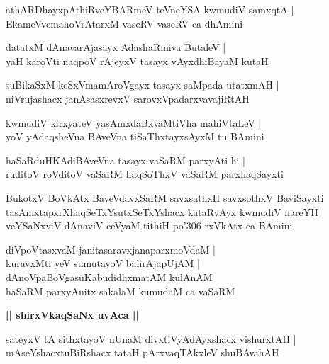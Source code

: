 \documentclass[twoside,12pt,openright]{book}
\newcounter{shloka}[chapter]
\def\uvaca#1{\centerline{{\large\textbf{#1}}}}
\begin{document}
\begin{shloka}%
athARDhayxpAthiRveYBARmeV teVneYSA kwmudiV samxqtA |\\
EkameVvemahoVrAtarxM vaseRV vaseRV ca dhAmini 
\end{shloka}

\begin{shloka}%
datatxM dAnavarAjasayx AdashaRmiva ButaleV |\\
yaH karoVti naqpoV rAjeyxV tasayx vAyxdhiBayaM kutaH 
\end{shloka}

\begin{shloka}%
suBikaSxM keSxVmamAroVgayx tasayx saMpada utatxmAH |\\
niVrujashacx janAsasxrevxV sarovxVpadarxvavajiRtAH 
\end{shloka}

\begin{shloka}%
kwmudiV kirxyateV yasAmxdaBxvaMtiVha mahiVtaLeV |\\
yoV yAdaqsheVna BAveVna tiSaThxtayxsAyxM tu BAmini
\end{shloka}

\begin{shloka}%
haSaRduHKAdiBAveVna tasayx vaSaRM parxyAti hi |\\
ruditoV roVditoV vaSaRM haqSoThxV vaSaRM parxhaqSayxti 
\end{shloka}

\begin{shloka}%
BukotxV BoVkAtx BaveVdavxSaRM savxsathxH savxsothxV BaviSayxti  \\
tasAmxtapxrXhaqSeTxYsutxSeTxYshacx kataRvAyx kwmudiV nareYH |\\
veYSaNxviV dAnaviV ceVyaM tithiH po\char'306 rxVkAtx ca BAmini
\end{shloka}

\begin{shloka}%
diVpoVtasxvaM janitasaravxjanaparxmoVdaM |\\
kuravxMti yeV sumutayoV balirAjapUjAM |\\
dAnoVpaBoVgasuKabudidhxmatAM kulAnAM \\
haSaRM parxyAnitx sakalaM kumudaM ca vaSaRM 
\end{shloka}

\uvaca{|| shirxVkaqSaNx uvAca ||}

\begin{shloka}%
sateyxV tA sithxtayoV nUnaM divxtiVyAdAyxshacx vishurxtAH |\\
mAseYshacxtuBiRshacx tataH pArxvaqTAkxleV shuBAvahAH 
\end{shloka}
\end{document}
